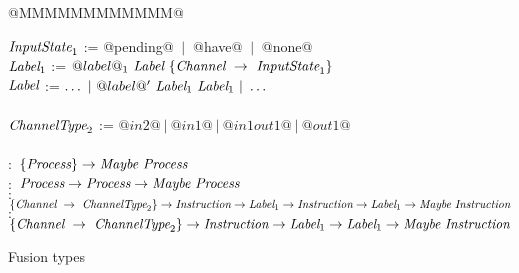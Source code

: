 
\begin{figure}

\begin{tabbing}
@MMMMMMMMMMMM@   \TABDEF \kill

$\textit{InputState}_1$ \> := \> @pending@ $~|~$ @have@ $~|~$ @none@
\\
$\textit{Label}_1$ \> := \> $@label@_1~\textit{Label}~\{\textit{Channel} ~\to~ \textit{InputState}_1\}$ \\
$\textit{Label}$   \> := \> $\ldots ~|~@label@'~\textit{Label}_1~\textit{Label}_1 ~|~ \ldots$ \\
\\

$\textit{ChannelType}_2$   \> := \> $@in2@~|~@in1@~|~@in1out1@~|~@out1@$ \\
\\
 \> $:$ \> $\{ \textit{Process} \} \to  \textit{Maybe}~\textit{Process}$ \\
 \> $:$ \> $\textit{Process} \to \textit{Process} \to  \textit{Maybe}~\textit{Process}$ \\
 \> $:$ \> $\{\textit{Channel} ~\to~ \textit{ChannelType}_2\} \to \textit{Instruction} \to \textit{Label}_1 \to \textit{Instruction} \to \textit{Label}_1 \to  \textit{Maybe}~\textit{Instruction}$ \\
 \> $:$ \> $\{\textit{Channel} ~\to~ \textit{ChannelType}_2\} \to \textit{Instruction} \to \textit{Label}_1 \to \textit{Label}_1 \to  \textit{Maybe}~\textit{Instruction}$ \\
\end{tabbing}

\caption{Fusion types}
\label{fig:Fusion:Types}
\end{figure}


